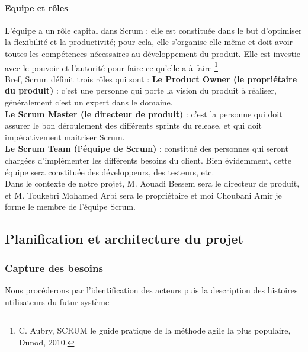 \documentclass{article}
\begin{document}
\paragraph{Equipe et rôles}
\guillemotleft L’équipe a un rôle capital dans Scrum : elle est constituée dans le but d’optimiser la flexibilité et la productivité; pour cela, elle s’organise elle-même et doit avoir toutes les compétences nécessaires au développement du produit. Elle est investie avec le pouvoir et l’autorité pour faire ce qu’elle a à faire \guillemotright \footnote{C. Aubry, SCRUM le guide pratique de la méthode agile la plus populaire, Dunod, 2010.}\\
Bref, Scrum définit trois rôles qui sont : 
\cleardoublepage
\textbf{Le Product Owner (le propriétaire du produit)} : c’est une personne qui porte la vision du produit à réaliser, généralement c’est un expert dans le domaine.\\

\textbf{Le Scrum Master (le directeur de produit) } : c'est la personne qui doit assurer le bon déroulement des différents sprints du release, et qui doit impérativement maitriser Scrum. \\

\textbf{Le Scrum Team (l’équipe de Scrum)} : constitué des personnes qui seront chargées d’implémenter les différents besoins du client. Bien évidemment, cette équipe sera constituée des développeurs, des testeurs, etc.\\
Dans le contexte de notre projet, M. Aouadi Bessem sera le directeur de produit, et M. Toukebri Mohamed Arbi sera le propriétaire et moi Choubani Amir  je forme le membre de l’équipe Scrum.
\subsection{Planification et architecture du projet}
\subsubsection{Capture des besoins}
Nous procéderons par l’identification des acteurs puis la description des histoires utilisateurs du futur système
\end{document}
